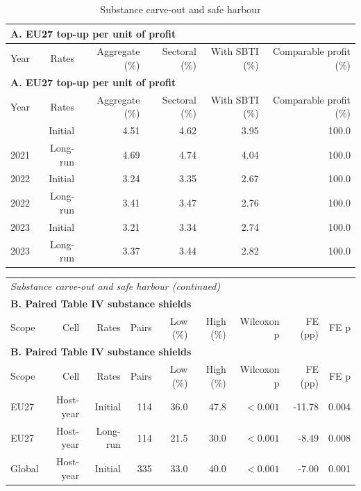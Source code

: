 {\small\setlength{\LTpre}{4pt}\setlength{\LTpost}{4pt}
\begin{longtable}{@{}lrrrrr@{}}
\caption{Substance carve-out and safe harbour}\label{tab:tab_v2_stage2_sbti_and_bracket_substance} \\
\multicolumn{6}{l}{\textbf{A. EU27 top-up per unit of profit}} \\
\toprule
Year & Rates & Aggregate (\%) & Sectoral (\%) & With SBTI (\%) & Comparable profit (\%) \\
\midrule
\endfirsthead
\multicolumn{6}{l}{\textbf{A. EU27 top-up per unit of profit}} \\
\toprule
Year & Rates & Aggregate (\%) & Sectoral (\%) & With SBTI (\%) & Comparable profit (\%) \\
\midrule
\endhead
\midrule
\endfoot
\bottomrule
\endlastfoot
2021 & Initial & 4.51 & 4.62 & 3.95 & 100.0 \\
2021 & Long-run & 4.69 & 4.74 & 4.04 & 100.0 \\
2022 & Initial & 3.24 & 3.35 & 2.67 & 100.0 \\
2022 & Long-run & 3.41 & 3.47 & 2.76 & 100.0 \\
2023 & Initial & 3.21 & 3.34 & 2.74 & 100.0 \\
2023 & Long-run & 3.37 & 3.44 & 2.82 & 100.0 \\
\end{longtable}
\addtocounter{table}{-1}
\begin{longtable}{@{}lrrrrrrrr@{}}
\multicolumn{9}{l}{\textit{Substance carve-out and safe harbour (continued)}} \\
\multicolumn{9}{l}{\textbf{B. Paired Table IV substance shields}} \\
\toprule
Scope & Cell & Rates & Pairs & Low (\%) & High (\%) & Wilcoxon p & FE (pp) & FE p \\
\midrule
\endfirsthead
\multicolumn{9}{l}{\textbf{B. Paired Table IV substance shields}} \\
\toprule
Scope & Cell & Rates & Pairs & Low (\%) & High (\%) & Wilcoxon p & FE (pp) & FE p \\
\midrule
\endhead
\midrule
\endfoot
\bottomrule
\endlastfoot
EU27 & Host-year & Initial & 114 & 36.0 & 47.8 & $<0.001$ & -11.78 & 0.004 \\
EU27 & Host-year & Long-run & 114 & 21.5 & 30.0 & $<0.001$ &  -8.49 & 0.008 \\
Global & Host-year & Initial & 335 & 33.0 & 40.0 & $<0.001$ &  -7.00 & 0.001 \\

\end{longtable}}
